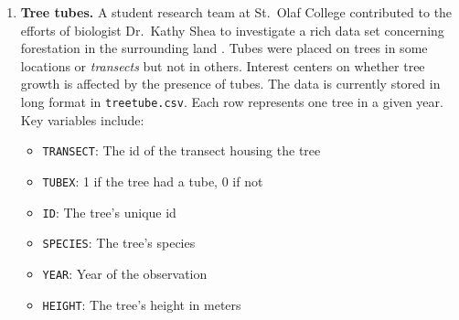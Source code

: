 \documentclass[
]{krantz}
\providecommand{\tightlist}{%
  \setlength{\itemsep}{0pt}\setlength{\parskip}{0pt}}
\begin{document}
\begin{enumerate}
\def\labelenumi{\arabic{enumi}.}
\tightlist
\item
  \textbf{Tree tubes.} A student research team at St.~Olaf College contributed to the efforts of biologist Dr.~Kathy Shea to investigate a rich data set concerning forestation in the surrounding land \citep{Eisinger2011}. Tubes were placed on trees in some locations or \emph{transects} but not in others. Interest centers on whether tree growth is affected by the presence of tubes. The data is currently stored in long format in \texttt{treetube.csv}. Each row represents one tree in a given year. Key variables include:

  \begin{itemize}
  \tightlist
  \item
    \texttt{TRANSECT}: The id of the transect housing the tree
  \item
    \texttt{TUBEX}: 1 if the tree had a tube, 0 if not
  \item
    \texttt{ID}: The tree's unique id
  \item
    \texttt{SPECIES}: The tree's species
  \item
    \texttt{YEAR}: Year of the observation
  \item
    \texttt{HEIGHT}: The tree's height in meters
  \end{itemize}


\end{enumerate}
\end{document}
